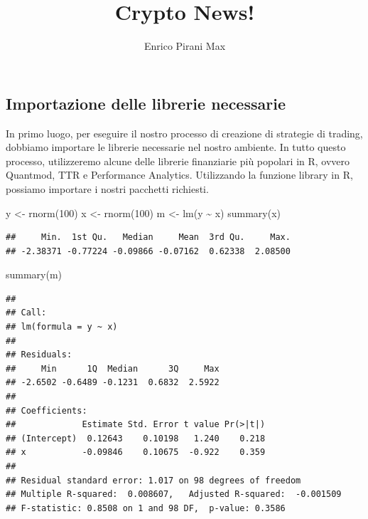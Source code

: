 \documentclass[]{tufte-handout}
\title[Una Newsletter sull'andamento delle crypto]{Crypto News!}
\author{Enrico Pirani Max}
\date{}
\newenvironment{Shaded}{}{}
\newcommand{\DecValTok}[1]{\textcolor[rgb]{0.25,0.63,0.44}{#1}}
\newcommand{\FunctionTok}[1]{\textcolor[rgb]{0.02,0.16,0.49}{#1}}
\newcommand{\NormalTok}[1]{#1}
\newcommand{\OtherTok}[1]{\textcolor[rgb]{0.00,0.44,0.13}{#1}}
\newcommand{\SpecialCharTok}[1]{\textcolor[rgb]{0.25,0.44,0.63}{#1}}
\begin{document}
\maketitle




\hypertarget{importazione-delle-librerie-necessarie}{%
\subsection{Importazione delle librerie
necessarie}\label{importazione-delle-librerie-necessarie}}

In primo luogo, per eseguire il nostro processo di creazione di
strategie di trading, dobbiamo importare le librerie necessarie nel
nostro ambiente. In tutto questo processo, utilizzeremo alcune delle
librerie finanziarie più popolari in R, ovvero Quantmod, TTR e
Performance Analytics. Utilizzando la funzione library in R, possiamo
importare i nostri pacchetti richiesti.

\begin{Shaded}
\begin{Highlighting}[]
\NormalTok{y }\OtherTok{\textless{}{-}} \FunctionTok{rnorm}\NormalTok{(}\DecValTok{100}\NormalTok{)}
\NormalTok{x }\OtherTok{\textless{}{-}} \FunctionTok{rnorm}\NormalTok{(}\DecValTok{100}\NormalTok{)}
\NormalTok{m }\OtherTok{\textless{}{-}} \FunctionTok{lm}\NormalTok{(y }\SpecialCharTok{\textasciitilde{}}\NormalTok{ x)}
\FunctionTok{summary}\NormalTok{(x)}
\end{Highlighting}
\end{Shaded}

\begin{verbatim}
##     Min.  1st Qu.   Median     Mean  3rd Qu.     Max. 
## -2.38371 -0.77224 -0.09866 -0.07162  0.62338  2.08500
\end{verbatim}

\begin{Shaded}
\begin{Highlighting}[]
\FunctionTok{summary}\NormalTok{(m)}
\end{Highlighting}
\end{Shaded}

\begin{verbatim}
## 
## Call:
## lm(formula = y ~ x)
## 
## Residuals:
##     Min      1Q  Median      3Q     Max 
## -2.6502 -0.6489 -0.1231  0.6832  2.5922 
## 
## Coefficients:
##             Estimate Std. Error t value Pr(>|t|)
## (Intercept)  0.12643    0.10198   1.240    0.218
## x           -0.09846    0.10675  -0.922    0.359
## 
## Residual standard error: 1.017 on 98 degrees of freedom
## Multiple R-squared:  0.008607,   Adjusted R-squared:  -0.001509 
## F-statistic: 0.8508 on 1 and 98 DF,  p-value: 0.3586
\end{verbatim}
\end{document}
